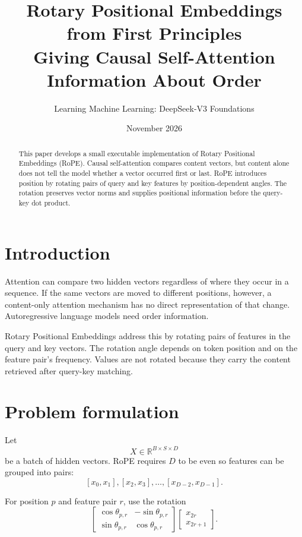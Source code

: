 \documentclass[11pt]{article}
\title{Rotary Positional Embeddings from First Principles\\
\large Giving Causal Self-Attention Information About Order}
\author{Learning Machine Learning: DeepSeek-V3 Foundations}
\date{November 2026}
\begin{document}
\maketitle

\begin{abstract}
This paper develops a small executable implementation of Rotary Positional
Embeddings (RoPE). Causal self-attention compares content vectors, but content
alone does not tell the model whether a vector occurred first or last. RoPE
introduces position by rotating pairs of query and key features by
position-dependent angles. The rotation preserves vector norms and supplies
positional information before the query-key dot product.
\end{abstract}

\tableofcontents
\newpage

\section{Introduction}
Attention can compare two hidden vectors regardless of where they occur in a
sequence. If the same vectors are moved to different positions, however, a
content-only attention mechanism has no direct representation of that change.
Autoregressive language models need order information.

Rotary Positional Embeddings address this by rotating pairs of features in the
query and key vectors. The rotation angle depends on token position and on the
feature pair's frequency. Values are not rotated because they carry the
content retrieved after query-key matching.

\section{Problem formulation}
Let
\[
X\in\mathbb{R}^{B\times S\times D}
\]
be a batch of hidden vectors. RoPE requires $D$ to be even so features can be
grouped into pairs:
\[
[x_0,x_1],[x_2,x_3],\ldots,[x_{D-2},x_{D-1}].
\]

For position $p$ and feature pair $r$, use the rotation
\[
\begin{bmatrix}
\cos\theta_{p,r} & -\sin\theta_{p,r}\\
\sin\theta_{p,r} & \cos\theta_{p,r}
\end{bmatrix}
\begin{bmatrix}x_{2r}\\x_{2r+1}\end{bmatrix}.
\]
\end{document}
